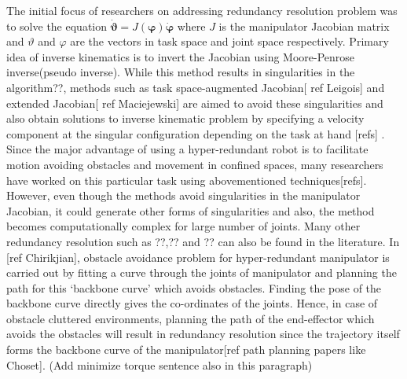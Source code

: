\documentclass[12pt,a4]{article}
\begin{document}
The initial focus of researchers on addressing redundancy resolution problem was to solve the equation $\dot{\mathbf{\vartheta}}=J\left(\mathbf{\varphi} \right)\dot{\mathbf{\varphi}}$ where $J$ is the manipulator Jacobian matrix and $\vartheta$ and $\varphi$ are the vectors in task space and joint space respectively. Primary idea of inverse kinematics is to invert the Jacobian using Moore-Penrose inverse(pseudo inverse). While this method results in singularities in the algorithm??, methods such as task space-augmented Jacobian[ ref Leigois] and extended Jacobian[ ref Maciejewski] are aimed to avoid these singularities and also obtain solutions to inverse kinematic problem by specifying a velocity component at the singular configuration depending on the task at hand [refs] . Since the major advantage of using a hyper-redundant robot is to facilitate motion avoiding obstacles and movement in confined spaces, many researchers have worked on this particular task using abovementioned techniques[refs]. However, even though the methods avoid singularities in the manipulator Jacobian, it could generate other forms of singularities and also, the method becomes computationally complex for large number of joints. Many other redundancy resolution such as ??,?? and ?? can also be found in the literature. In [ref Chirikjian], obstacle avoidance problem for hyper-redundant manipulator is carried out by fitting a curve through the joints of manipulator and planning the path for this `backbone curve' which avoids obstacles. Finding the pose of the backbone curve directly gives the co-ordinates of the joints. Hence, in case of obstacle cluttered environments, planning the path of the end-effector which avoids the obstacles will result in redundancy resolution since the trajectory itself forms the backbone curve of the manipulator[ref path planning papers like Choset]. (Add minimize torque sentence also in this paragraph)
\end{document}
